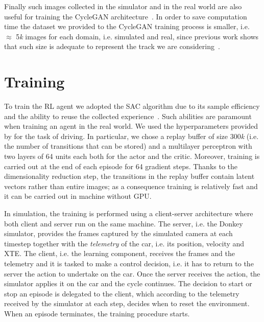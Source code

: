 Finally such images collected in the simulator and in the real world are also useful for training the CycleGAN architecture~\cite{CycleGAN2017}. In order to save computation time the dataset we provided to the CycleGAN training process is smaller, i.e. $\approx$ 5\textit{k} images for each domain, i.e. simulated and real, since previous work shows that such size is adequate to represent the track we are considering~\cite{stocco-mind}.

\section{Training}

To train the RL agent we adopted the SAC algorithm due to its sample efficiency and the ability to reuse the collected experience~\cite{art:sac}. Such abilities are paramount when training an agent in the real world. We used the hyperparameters provided by \cite{learning-to-drive-in-5-minutes} for the task of driving. In particular, we chose a replay buffer of size $300$\textit{k} (i.e. the number of transitions that can be stored) and a multilayer perceptron with two layers of 64 units each both for the actor and the critic. Moreover, training is carried out at the end of each episode for 64 gradient steps. Thanks to the dimensionality reduction step, the transitions in the replay buffer contain latent vectors rather than entire images; as a consequence training is relatively fast and it can be carried out in machine without GPU. 

In simulation, the training is performed using a client-server architecture where both client and server run on the same machine. The server, i.e. the Donkey simulator, provides the frames captured by the simulated camera at each timestep together with the \textit{telemetry} of the car, i.e. its position, velocity and XTE. The client, i.e. the learning component, receives the frames and the telemetry and it is tasked to make a control decision, i.e. it has to return to the server the action to undertake on the car. Once the server receives the action, the simulator applies it on the car and the cycle continues. The decision to start or stop an episode is delegated to the client, which according to the telemetry received by the simulator at each step, decides when to reset the environment. When an episode terminates, the training procedure starts. 

